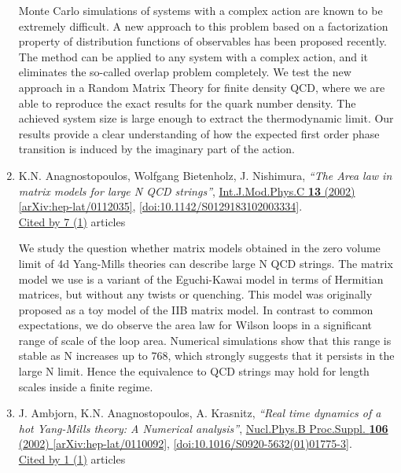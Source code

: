 \documentclass[a4paper,10pt]{article}
\begin{document}
\begin{enumerate}
Monte Carlo simulations of systems with a complex action are known to be extremely difficult. A new approach to this problem based on a factorization property of distribution functions of observables has been proposed recently. The method can be applied to any system with a complex action, and it eliminates the so-called overlap problem completely. We test the new approach in a Random Matrix Theory for finite density QCD, where we are able to reproduce the exact results for the quark number density. The achieved system size is large enough to extract the thermodynamic limit. Our results provide a clear understanding of how the expected first order phase transition is induced by the imaginary part of the action.
\item K.N. Anagnostopoulos, Wolfgang Bietenholz, J. Nishimura, {\it ``The Area law in matrix models for large N QCD strings''}, \href{https://www.doi.org/10.1142/S0129183102003334}{Int.J.Mod.Phys.C {\bf 13} (2002) } \href{https://arxiv.org/abs/hep-lat/0112035}{[arXiv:hep-lat/0112035]}, \href{https://www.doi.org/10.1142/S0129183102003334}{[doi:10.1142/S0129183102003334]}.
\\\href{https://inspirehep.net/literature/?q=refersto%3Arecid%3A568670}{Cited by 7 (1)} articles

We study the question whether matrix models obtained in the zero volume limit of 4d Yang-Mills theories can describe large N QCD strings. The matrix model we use is a variant of the Eguchi-Kawai model in terms of Hermitian matrices, but without any twists or quenching. This model was originally proposed as a toy model of the IIB matrix model. In contrast to common expectations, we do observe the area law for Wilson loops in a significant range of scale of the loop area. Numerical simulations show that this range is stable as N increases up to 768, which strongly suggests that it persists in the large N limit. Hence the equivalence to QCD strings may hold for length scales inside a finite regime.
\item J. Ambjorn, K.N. Anagnostopoulos, A. Krasnitz, {\it ``Real time dynamics of a hot Yang-Mills theory: A Numerical analysis''}, \href{https://www.doi.org/10.1016/S0920-5632(01)01775-3}{Nucl.Phys.B Proc.Suppl. {\bf 106} (2002) } \href{https://arxiv.org/abs/hep-lat/0110092}{[arXiv:hep-lat/0110092]}, \href{https://www.doi.org/10.1016/S0920-5632(01)01775-3}{[doi:10.1016/S0920-5632(01)01775-3]}.
\\\href{https://inspirehep.net/literature/?q=refersto%3Arecid%3A564302}{Cited by 1 (1)} articles


\end{enumerate}
\end{document}
